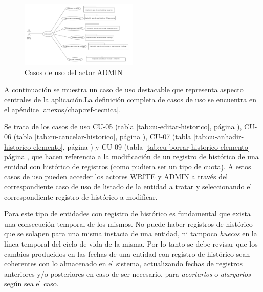 \begin{figure}[H]
  \centering
  \includegraphics[width=0.50\textwidth]{imaxes/cu-admin.png}
  \caption{Casos de uso del actor ADMIN}
  \label{fig:cu-admin}
\end{figure}



A continuación se muestra un caso de uso destacable que representa
aspecto centrales de la aplicación.La definición completa de casos de uso se encuentra en el apéndice \ref{anexos/chap:ref-tecnica}. 

Se trata de los casos de uso CU-05 (tabla \ref{tab:cu-editar-historico}, página \pageref{tab:cu-editar-historico}), CU-06 (tabla \ref{tab:cu-cancelar-historico}, página \pageref{tab:cu-cancelar-historico}), CU-07 (tabla \ref{tab:cu-anhadir-historico-elemento}, página \pageref{tab:cu-anhadir-historico-elemento}) y CU-09 (tabla \ref{tab:cu-borrar-historico-elemento} página \pageref{tab:cu-borrar-historico-elemento}, que hacen referencia a la modificación de un registro de histórico de una entidad con histórico de registros (como pudiera ser un tipo de cuota). A estos casos de uso pueden acceder los actores WRITE y ADMIN a través del correspondiente caso de uso de listado de la entidad a tratar y seleccionando el correspondiente registro de histórico a modificar.

Para este tipo de entidades con registro de histórico es fundamental que exista una consecución temporal de los mismos. No puede haber registros de histórico que se solapen para una misma instacia de una entidad, ni tampoco \textit{huecos} en la línea temporal del ciclo de vida de la misma. Por lo tanto se debe revisar que los cambios producidos en las fechas de una entidad con registro de histórico sean coherentes con lo almacenado en el sistema, actualizando fechas de registros anteriores y/o posteriores en caso de ser necesario, para \textit{acortarlos} o \textit{alargarlos} según sea el caso.


